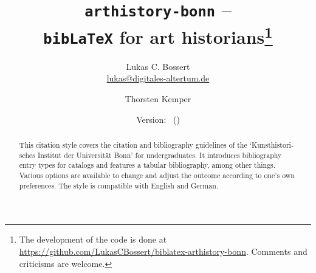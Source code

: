 \documentclass[a4paper,
10pt,
ngerman,
english
]{ltxdoc}
\begin{document}
\title{\texttt{arthistory-bonn} -- \\\texttt{bib\LaTeX} for art historians\footnote{The development of the code is done at \url{https://github.com/LukasCBossert/biblatex-arthistory-bonn}. 
Comments and criticisms are welcome.}}

\author{Lukas C. Bossert\protect\\%
{\small \href{mailto:lukas@digitales-altertum.de}{lukas@digitales-altertum.de}}
 \and Thorsten Kemper}
 
\date{Version: \arthistoryversion\ (\arthistorydate)
} 
\maketitle
 
 \begin{abstract}
\noindent This citation style covers the citation and bibliography guidelines of the \foreignquote*{ngerman}{Kunsthistorisches Institut der Universität Bonn} for undergraduates.
It introduces bibliography entry types for catalogs and features a tabular bibliography, among other things.
Various options are available to change and adjust the outcome according to one's own preferences. 
The style is compatible with English and German.
 \end{abstract}


\begin{multicols}{2}
\footnotesize\parskip=0mm \tableofcontents
\end{multicols}
\end{document}
